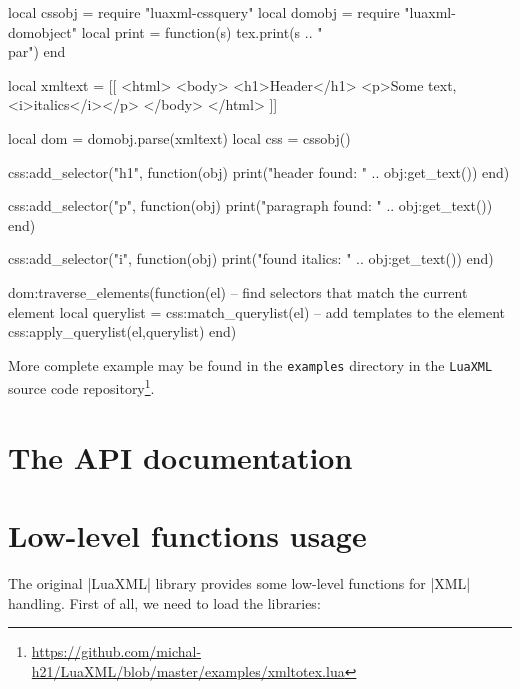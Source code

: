 \documentclass{ltxdoc}
\begin{document}
\begin{framed}
  \begin{luacode*}
local cssobj = require "luaxml-cssquery"
local domobj = require "luaxml-domobject"
local print = function(s) tex.print(s .. "\\par") end

local xmltext = [[
<html>
<body>
<h1>Header</h1>
<p>Some text, <i>italics</i></p>
</body>
</html>
]]

local dom = domobj.parse(xmltext)
local css = cssobj()

css:add_selector("h1", function(obj)
  print("header found: "  .. obj:get_text())
end)

css:add_selector("p", function(obj)
  print("paragraph found: " .. obj:get_text())
end)

css:add_selector("i", function(obj)
  print("found italics: " .. obj:get_text())
end)

dom:traverse_elements(function(el)
  -- find selectors that match the current element
  local querylist = css:match_querylist(el)
  -- add templates to the element
  css:apply_querylist(el,querylist)
end)
  \end{luacode*}
\end{framed}

More complete example may be found in the \texttt{examples} directory in the
\texttt{LuaXML} source code
repository\footnote{\url{https://github.com/michal-h21/LuaXML/blob/master/examples/xmltotex.lua}}.

\section{The API documentation}



\section{Low-level functions usage}



The original |LuaXML| library provides some low-level functions for |XML| handling.
First of all, we need to load the libraries:
\end{document}
